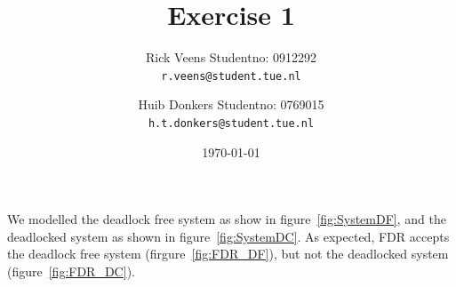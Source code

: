 \documentclass[a4paper,twoside,11pt]{article}
\title{\vspace{-\baselineskip}\sffamily\bfseries Exercise 1}
\author{
	Rick Veens \qquad Studentno: 0912292\\
	\texttt{r.veens@student.tue.nl}
	\and
	Huib Donkers \qquad Studentno: 0769015\\
	\texttt{h.t.donkers@student.tue.nl}
}
\date{\today}
\begin{document}
\maketitle

\section{}
\subsection{}
\subsubsection{}
We modelled the deadlock free system as show in figure~\ref{fig:SystemDF}, and the deadlocked system as shown in figure~\ref{fig:SystemDC}. As expected, FDR accepts the deadlock free system (firgure~\ref{fig:FDR_DF}), but not the deadlocked system (figure~\ref{fig:FDR_DC}).
\end{document}

